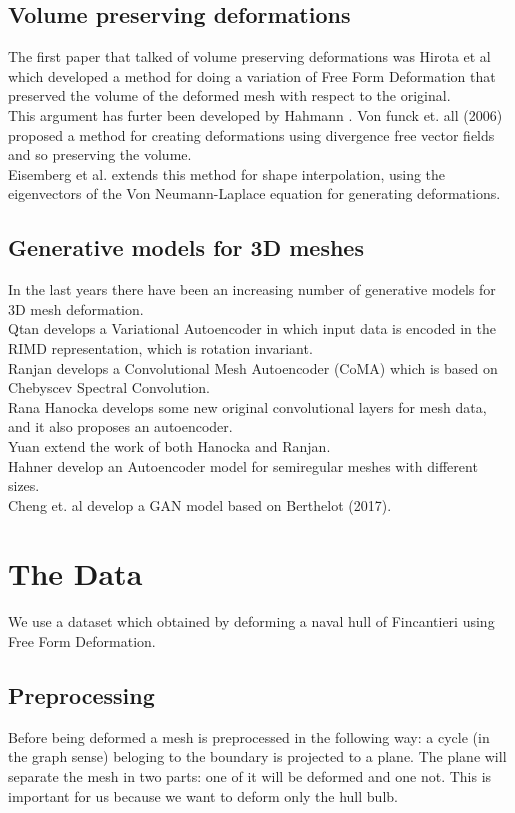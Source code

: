 \documentclass{article}
\begin{document}
\subsection{Volume preserving deformations}
The first paper that talked of volume preserving deformations was Hirota et al \cite{hirota} which developed a method for doing a variation of Free Form Deformation that preserved the volume of the deformed mesh with respect to the original.\\
This argument has furter been developed by Hahmann \cite{hahmann}.
Von funck \cite{vonfunck} et. all (2006) proposed a method for creating deformations using divergence free vector fields and so preserving the volume.\\
Eisemberg et al. \cite{eisemberg} extends this method for shape interpolation, using the eigenvectors of the Von Neumann-Laplace equation for generating deformations. 
\subsection{Generative models for 3D meshes}
In the last years there have been an increasing number of generative models for 3D mesh deformation.\\
Qtan \cite{qtan} develops a Variational Autoencoder in which input data is encoded in the RIMD representation, which is rotation invariant.\\
Ranjan\cite{ranjan} develops a Convolutional Mesh Autoencoder (CoMA) which is based on Chebyscev Spectral Convolution.\\
Rana Hanocka \cite{hanocka} develops some new original convolutional layers for mesh data, and it also proposes an autoencoder.\\
Yuan \cite{yuan} extend the work of both Hanocka and Ranjan.\\
Hahner \cite{hahner} develop an Autoencoder model for semiregular meshes with different sizes.\\
Cheng \cite{cheng} et. al develop a GAN model based on Berthelot (2017).\\
\section{The Data}
We use a dataset which obtained by deforming a naval hull of Fincantieri using Free Form Deformation.

\subsection{Preprocessing}
Before being deformed a mesh is preprocessed in the following way: a  cycle (in the graph sense) beloging to the boundary is projected to a plane. The plane will separate the mesh in two parts: one of it will be deformed and one not. This is important for us because we want to deform only the hull bulb.
\end{document}
